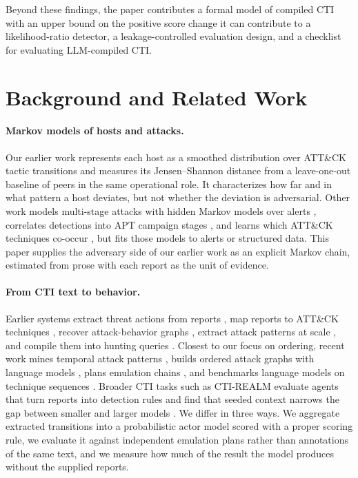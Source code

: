 \documentclass[letterpaper]{article} %
\begin{document}
Beyond these findings, the paper contributes a formal model of compiled CTI with an upper bound on the positive score change it can contribute to a likelihood-ratio detector, a leakage-controlled evaluation design, and a checklist for evaluating LLM-compiled CTI.

\section{Background and Related Work}

\paragraph{Markov models of hosts and attacks.} Our earlier work \citep{moody2026drift} represents each host as a smoothed distribution over ATT\&CK tactic transitions and measures its Jensen--Shannon distance from a leave-one-out baseline of peers in the same operational role. It characterizes how far and in what pattern a host deviates, but not whether the deviation is adversarial. Other work models multi-stage attacks with hidden Markov models over alerts \citep{ourston2003hmm}, correlates detections into APT campaign stages \citep{milajerdi2019holmes}, and learns which ATT\&CK techniques co-occur \citep{alshaer2020associations}, but fits those models to alerts or structured data. This paper supplies the adversary side of our earlier work as an explicit Markov chain, estimated from prose with each report as the unit of evidence.


\paragraph{From CTI text to behavior.} Earlier systems extract threat actions from reports \citep{husari2017ttpdrill}, map reports to ATT\&CK techniques \citep{legoy2020rcatt,mitre2023tram}, recover attack-behavior graphs \citep{satvat2021extractor}, extract attack patterns at scale \citep{alam2023ladder}, and compile them into hunting queries \citep{gao2021threatraptor}. Closest to our focus on ordering, recent work mines temporal attack patterns \citep{rahman2024chronocti}, builds ordered attack graphs with language models \citep{zhang2025attackgplus}, plans emulation chains \citep{wang2024aurora}, and benchmarks language models on technique sequences \citep{ma2025attackseqbench}. Broader CTI tasks \citep{alam2024ctibench} such as CTI-REALM evaluate agents that turn reports into detection rules and find that seeded context narrows the gap between smaller and larger models \citep{chakraborty2026ctirealm}. We differ in three ways. We aggregate extracted transitions into a probabilistic actor model scored with a proper scoring rule, we evaluate it against independent emulation plans rather than annotations of the same text, and we measure how much of the result the model produces without the supplied reports.
\end{document}
